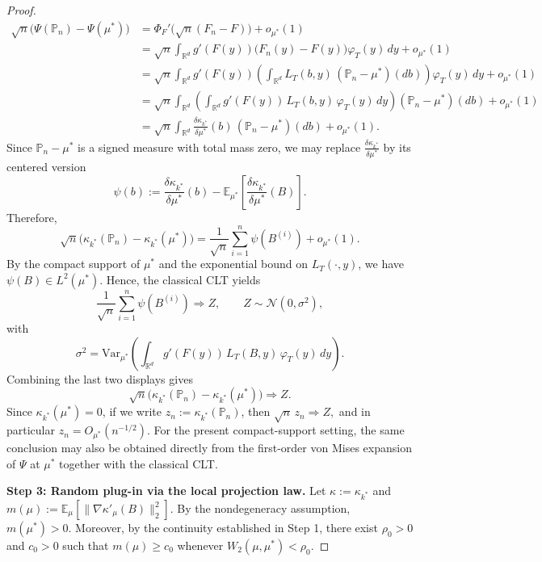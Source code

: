 \documentclass[11pt]{article}
\theoremstyle{definition}
\newcommand{\var}{\text{Var}}
\newcommand{\E}{\mathbb{E}}
\begin{document}
\begin{proof}
{\begin{align*}
\sqrt n\big(\Psi(\mathbb P_n)-\Psi(\mu^*)\big)
&=
\Phi_F'\!\big(\sqrt n(F_n-F)\big)+o_{\mu^*}(1) \\
&=
\sqrt n\int_{\mathbb R^d}
g'(F(y))\big(F_n(y)-F(y)\big)\varphi_T(y)\,dy
+o_{\mu^*}(1) \\
&=
\sqrt n\int_{\mathbb R^d}
g'(F(y))
\left(
\int_{\mathbb R^d} L_T(b,y)\,(\mathbb P_n-\mu^*)(db)
\right)
\varphi_T(y)\,dy
+o_{\mu^*}(1) \\
&=
\sqrt n\int_{\mathbb R^d}
\left(
\int_{\mathbb R^d}
g'(F(y))\,L_T(b,y)\,\varphi_T(y)\,dy
\right)
(\mathbb P_n-\mu^*)(db)
+o_{\mu^*}(1) \\
&=
\sqrt n\int_{\mathbb R^d}
\frac{\delta \kappa_{k^*}}{\delta \mu^*}(b)\,
(\mathbb P_n-\mu^*)(db)
+o_{\mu^*}(1).
\end{align*}
Since $\mathbb P_n-\mu^*$ is a signed measure with total mass zero, we may replace
$\frac{\delta \kappa_{k^*}}{\delta \mu^*}$ by its centered version
\[
\psi(b)
:=
\frac{\delta \kappa_{k^*}}{\delta \mu^*}(b)
-
\mathbb E_{\mu^*}\!\left[
\frac{\delta \kappa_{k^*}}{\delta \mu^*}(B)
\right].
\]
Therefore, 
\[
\sqrt n\big(\kappa_{k^*}(\mathbb P_n)-\kappa_{k^*}(\mu^*)\big)
=
\frac{1}{\sqrt n}\sum_{i=1}^n \psi(B^{(i)})
+o_{\mu^*}(1).
\]
By the compact support of $\mu^*$ and the exponential bound on $L_T(\cdot,y)$, we have
$\psi(B)\in L^2(\mu^*)$. Hence, the classical CLT yields
\[
\frac{1}{\sqrt n}\sum_{i=1}^n \psi(B^{(i)}) \Rightarrow Z,
\qquad Z\sim \mathcal N(0,\sigma^2),
\]
with
\[
\sigma^2
=
\var_{\mu^*}\!\left(
\int_{\mathbb R^d}
g'(F(y))\,L_T(B,y)\,\varphi_T(y)\,dy
\right).
\]
Combining the last two displays gives
\[
\sqrt n\big(\kappa_{k^*}(\mathbb P_n)-\kappa_{k^*}(\mu^*)\big)
\Rightarrow Z.
\]
Since $\kappa_{k^*}(\mu^*)=0$, if we write $z_n:=\kappa_{k^*}(\mathbb P_n)$,
then $\sqrt n\, z_n \Rightarrow Z,$
and in particular $z_n=O_{\mu^*}(n^{-1/2})$.
For the present compact-support setting, the same conclusion may also be obtained directly from the first-order von Mises expansion of $\Psi$ at $\mu^*$ together with the classical CLT.}

\medskip
{\noindent\textbf{Step 3: Random plug-in via the local projection law.}
Let $\kappa := \kappa_{k^*}$ and $m(\mu) := \E_{\mu}\!\left[\|\nabla \kappa'_{\mu}(B)\|_2^2\right].$
By the nondegeneracy assumption, $m(\mu^*)>0$. Moreover, by the continuity established in Step 1, there exist $\rho_0>0$ and $c_0>0$ such that $m(\mu) \ge c_0$ whenever $W_2(\mu,\mu^*)<\rho_0.$}


\end{proof}
\end{document}

